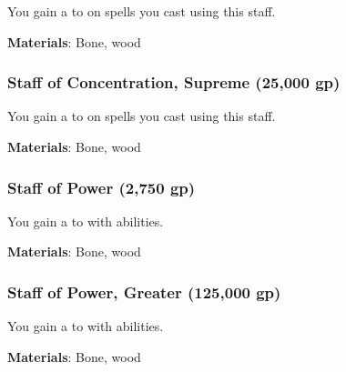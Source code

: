 You gain a   to  on spells you cast using this staff.



\vspace{0.25em}
\textbf{Materials}: Bone, wood


\lowercase{\hypertarget{item:Staff of Concentration, Supreme}{}}\label{item:Staff of Concentration, Supreme}
\hypertarget{item:Staff of Concentration, Supreme}{\subsubsection{Staff of Concentration, Supreme\hfill{} (25,000 gp)}}

You gain a   to  on spells you cast using this staff.



\vspace{0.25em}
\textbf{Materials}: Bone, wood


\lowercase{\hypertarget{item:Staff of Power}{}}\label{item:Staff of Power}
\hypertarget{item:Staff of Power}{\subsubsection{Staff of Power\hfill{} (2,750 gp)}}

You gain a   to  with  abilities.



\vspace{0.25em}
\textbf{Materials}: Bone, wood


\lowercase{\hypertarget{item:Staff of Power, Greater}{}}\label{item:Staff of Power, Greater}
\hypertarget{item:Staff of Power, Greater}{\subsubsection{Staff of Power, Greater\hfill{} (125,000 gp)}}

You gain a   to  with  abilities.



\vspace{0.25em}
\textbf{Materials}: Bone, wood


